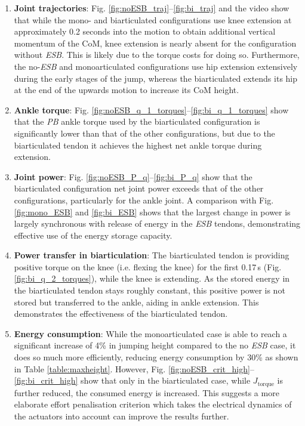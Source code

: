 \documentclass[letterpaper, 10 pt, conference]{ieeeconf}  %
\begin{document}
\begin{enumerate}
	\item \textbf{Joint trajectories}: Fig. \ref{fig:noESB_traj}--\ref{fig:bi_traj} and the video show that while the mono- and biarticulated configurations use knee extension at approximately 0.2 seconds into the motion to obtain additional vertical momentum of the CoM, knee extension is nearly absent for the configuration without \textit{ESB}. This is likely due to the torque costs for doing so. Furthermore, the no-\textit{ESB} and monoarticulated configurations use hip extension extensively during the early stages of the jump, whereas the biarticulated extends its hip at the end of the upwards motion to increase its CoM height.

	\item \textbf{Ankle torque}: Fig. \ref{fig:noESB_q_1_torques}--\ref{fig:bi_q_1_torques} show that the \textit{PB} ankle torque used by the biarticulated configuration is significantly lower than that of the other configurations, but due to the biarticulated tendon it achieves the highest net ankle torque during extension.
	
	\item \textbf{Joint power}: Fig. \ref{fig:noESB_P_q}--\ref{fig:bi_P_q} show that the biarticulated configuration net joint power exceeds that of the other configurations, particularly for the ankle joint. A comparison with Fig. \ref{fig:mono_ESB} and \ref{fig:bi_ESB} shows that the largest change in power is largely synchronous with release of energy in the \textit{ESB} tendons, demonstrating effective use of the energy storage capacity.
	
	\item \textbf{Power transfer in biarticulation}: The biarticulated tendon is providing positive torque on the knee (i.e. flexing the knee) for the first 0.17\,s (Fig. \ref{fig:bi_q_2_torques}), while the knee is extending. As the stored energy in the biarticulated tendon stays roughly constant, this positive power is not stored but transferred to the ankle, aiding in ankle extension. This demonstrates the effectiveness of the biarticulated tendon.
	
	\item \textbf{Energy consumption}: While the monoarticulated case is able to reach a significant increase of 4\% in jumping height compared to the no \textit{ESB} case, it does so much more efficiently, reducing energy consumption by 30\%  as shown in Table \ref{table:maxheight}. However, Fig. \ref{fig:noESB_crit_high}--\ref{fig:bi_crit_high} show that only in the biarticulated case, while $J_{\text{torque}}$ is further reduced, the consumed energy is increased. This suggests a more elaborate effort penalisation criterion which takes the electrical dynamics of the actuators into account can improve the results further.
\end{enumerate}
\end{document}
